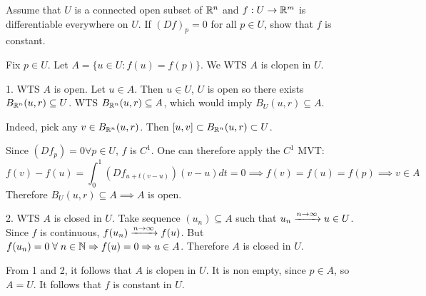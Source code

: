 \documentclass[a4paper, 12pt]{article}
\begin{document}
\begin{problem} 
Assume that $U$ is a connected open subset of $\mathbb{R}^n$ and $f: U \to \mathbb{R}^m$ is differentiable everywhere on $U$. If $(Df)_p = 0$ for all $p \in U$, show that $f$ is constant.
\end{problem}
\begin{solution}
    Fix $p \in U$. Let $A = \{u \in U : f(u) = f(p)\}$. We WTS $A$ is clopen in $U$.

    1. WTS $A$ is open. Let $u \in A$. Then $u \in U$, $U$ is open so there exists $B_{\mathbb{R}^n}(u, r) \subseteq U$. WTS $B_{\mathbb{R}^n}(u, r) \subseteq A$, which would imply $B_{U}(u, r) \subseteq A$.

    Indeed, pick any $v \in B_{\mathbb{R}^n}(u, r)$. Then $[u, v] \subset B_{\mathbb{R}^n}(u, r) \subset U$.

    Since $(Df_p) = 0 \forall p \in U$, $f$ is $C^1$. One can therefore apply the $C^1$ MVT:
    \[
        f(v) - f(u) = \int_{0}^{1} (Df_{u + t(v-u)})(v-u) dt = 0 \implies f(v) = f(u) = f(p) \implies v \in A
    \]
    Therefore $B_U(u, r) \subseteq A \implies A$ is open.

    2. WTS $A$ is closed in $U$. Take sequence $(u_n) \subseteq A$ such that $u_n \xrightarrow{n \to \infty} u \in U$. Since $f$ is continuous, $f(u_n) \xrightarrow{n \to \infty} f(u)$. But $f(u_n) = 0 \forall n \in \bbn \implies f(u) = 0 \implies u \in A$. Therefore $A$ is closed in $U$.

    From 1 and 2, it follows that $A$ is clopen in $U$. It is non empty, since $p \in A$, so $A = U$. It follows that $f$ is constant in $U$.
\end{solution}
\end{document}

